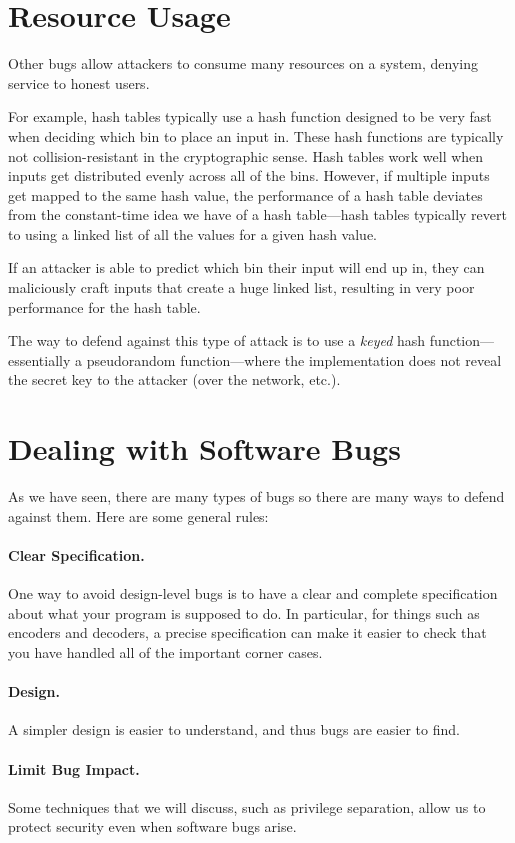 \section{Resource Usage}
Other bugs allow attackers to consume many resources on a system, denying service to honest users.

For example, 
hash tables typically use a hash function designed to be very fast when deciding which bin to place an input in. These hash functions are typically not collision-resistant in the cryptographic sense. Hash tables work well when inputs get distributed evenly across all of the bins. However, if multiple inputs get mapped to the same hash value, the performance of a hash table deviates from the constant-time idea we have of a hash table---hash tables typically revert to using a linked list of all the values for a given hash value.

If an attacker is able to predict which bin their input will end up in, they can maliciously craft inputs that create a huge linked list, resulting in very poor performance for the hash table.

The way to defend against this type of attack 
is to use a \emph{keyed} hash function---essentially a pseudorandom function---where
the implementation does not reveal the secret key to the attacker (over the network, etc.).

\section{Dealing with Software Bugs}
As we have seen, there are many types of bugs so there are many ways
to defend against them.
Here are some general rules:

\paragraph{Clear Specification.} One way to avoid design-level bugs is to have a clear and complete specification about what your program is supposed to do.
In particular, for things such as encoders and decoders, a precise specification
can make it easier to check that you have handled all of the important corner cases.

\paragraph{Design.} A simpler design is easier to understand, 
and thus bugs are easier to find. 

\paragraph{Limit Bug Impact.} 
Some techniques that we will
discuss, such as privilege separation, allow us to protect
security even when software bugs arise.

